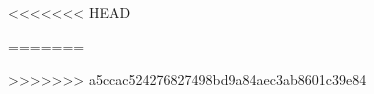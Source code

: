 \cleardoublepage
{}
{}
<<<<<<< HEAD


=======
%
%

\printbibliography
>>>>>>> a5ccac524276827498bd9a84aec3ab8601c39e84
